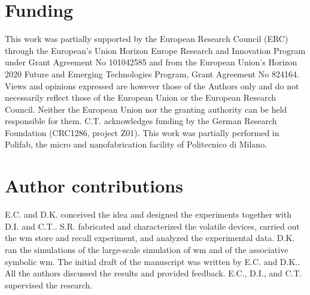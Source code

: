 \documentclass{article}
\begin{document}
\section*{Funding}
This work was partially supported by the European Research Council (ERC) through the European's Union Horizon Europe Research and Innovation Program under Grant Agreement No 101042585 and from the European Union’s Horizon 2020 Future and Emerging Technologies Program, Grant Agreement No 824164. Views and opinions expressed are however those of the Authors only and do not necessarily reflect those of the European Union or the European Research Council. Neither the European Union nor the granting authority can be held responsible for them.  C.T. acknowledges funding by the German Research Foundation (CRC1286, project Z01). This work was partially performed in Polifab, the micro and nanofabrication facility of Politecnico di Milano. 

\section*{Author contributions}
E.C. and D.K. conceived the idea and designed the experiments together with D.I. and C.T.. S.R. fabricated and characterized the volatile devices, carried out the \gls{wm} store and recall experiment, and analyzed the experimental data. D.K. ran the simulations of the large-scale simulation of \gls{wm} and of the associative symbolic \gls{wm}. The initial draft of the manuscript was written by E.C. and D.K.. All the authors discussed the results and provided feedback. E.C., D.I., and C.T. supervised the research.


\end{document}
